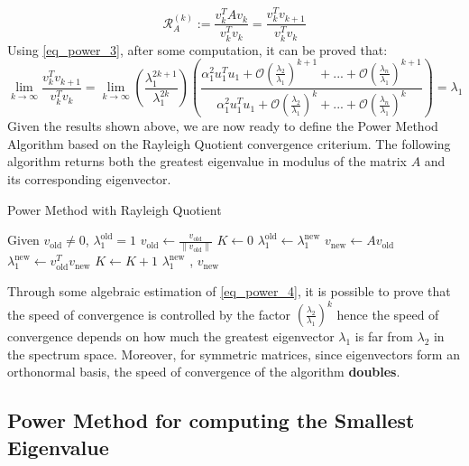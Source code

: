 \begin{equation}
    \mathcal{R}_A^{(k)} := \frac{v_k^T A v_k}{v_k^T v_k} = \frac{v_k^T  v_{k+1}}{v_k^T v_k} 
\end{equation}
Using \ref{eq_power_3}, after some computation, it can be proved that:
\begin{equation} \label{eq_power_4}
    \lim_{k \to \infty} \frac{v_k^T  v_{k+1}}{v_k^T v_k} = \lim_{k \to \infty} \left(\frac{\lambda_1^{2k+1}}{\lambda_1^{2k}}\right) \left(\frac{\alpha_1^2 u_1^T u_1 + \mathcal{O}\left(\frac{\lambda_2}{\lambda_1}\right)^{k+1}+ ... + \mathcal{O}\left(\frac{\lambda_n}{\lambda_1}\right)^{k+1}}{\alpha_1^2 u_1^T u_1 + \mathcal{O}\left(\frac{\lambda_2}{\lambda_1}\right)^{k}+ ... + \mathcal{O}\left(\frac{\lambda_n}{\lambda_1}\right)^{k}}\right) = \lambda_1
\end{equation}
Given the results shown above, we are now ready to define the Power Method Algorithm based on the Rayleigh Quotient convergence criterium. The following algorithm returns both the greatest eigenvalue in modulus of the matrix \(A\) and its corresponding eigenvector.
\begin{algorithm}\caption{Power Method with Rayleigh Quotient}
    \label{algo:power_method}
    \begin{algorithmic}
     \State Given \(v_{\text{old}} \neq 0\), \(\lambda_1^{\text{old}} = 1\) 
     \State \(v_{\text{old}} \gets \frac{v_{\text{old}}}{\| v_{\text{old}}\|}\)
     \State \(K \gets 0\)
     \State \(\lambda_1^{\text{old}} \gets \lambda_1^{\text{new}}\)
     \State \(v_{\text{new}} \gets  A v_{\text{old}}\)
     \State \(\lambda_1^{\text{new}} \gets  v_{\text{old}}^T v_{\text{new}}\)
     \State \(K \gets K+ 1\)
     \EndWhile
     \State
     \Return \(\lambda_1^{\text{new}}\) , \(v_{\text{new}}\)
    \end{algorithmic}            
  \end{algorithm}
  \begin{mdframed}
    Through some algebraic estimation of \ref{eq_power_4}, it is possible to prove that the speed of convergence is controlled by the factor \(\left(\frac{\lambda_2}{\lambda_1}\right)^k\) hence the speed of convergence depends on how much the greatest eigenvector \(\lambda_1\) is far from \(\lambda_2\) in the spectrum space. Moreover, for symmetric matrices, since eigenvectors form an orthonormal basis, the speed of convergence of the algorithm \textbf{doubles}.
  \end{mdframed}

  \subsection*{Power Method for computing the Smallest Eigenvalue}
  
  